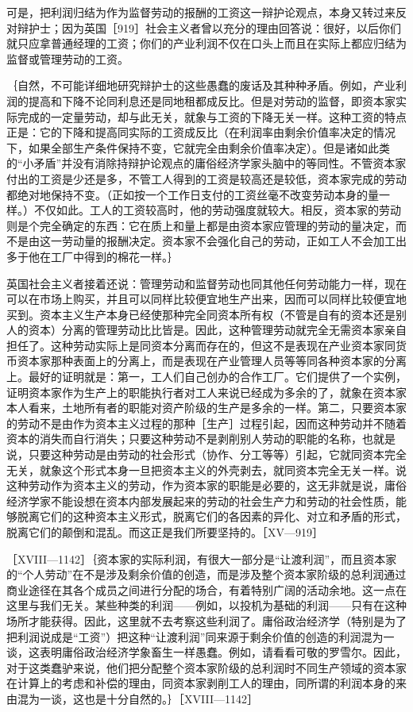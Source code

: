 可是，把利润归结为作为监督劳动的报酬的工资这一辩护论观点，本身又转过来反对辩护士；因为英国［919］社会主义者曾以充分的理由回答说：很好，以后你们就只应拿普通经理的工资；你们的产业利润不仅在口头上而且在实际上都应归结为监督或管理劳动的工资。

｛自然，不可能详细地研究辩护士的这些愚蠢的废话及其种种矛盾。例如，产业利润的提高和下降不论同利息还是同地租都成反比。但是对劳动的监督，即资本家实际完成的一定量劳动，却与此无关，就象与工资的下降无关一样。这种工资的特点正是：它的下降和提高同实际的工资成反比（在利润率由剩余价值率决定的情况下，如果全部生产条件保持不变，它就完全由剩余价值率决定）。但是诸如此类的“小矛盾”并没有消除持辩护论观点的庸俗经济学家头脑中的等同性。不管资本家付出的工资是少还是多，不管工人得到的工资是较高还是较低，资本家完成的劳动都绝对地保持不变。（正如按一个工作日支付的工资丝毫不改变劳动本身的量一样。）不仅如此。工人的工资较高时，他的劳动强度就较大。相反，资本家的劳动则是个完全确定的东西：它在质上和量上都是由资本家应管理的劳动的量决定，而不是由这一劳动量的报酬决定。资本家不会强化自己的劳动，正如工人不会加工出多于他在工厂中得到的棉花一样。｝

英国社会主义者接着还说：管理劳动和监督劳动也同其他任何劳动能力一样，现在可以在市场上购买，并且可以同样比较便宜地生产出来，因而可以同样比较便宜地买到。资本主义生产本身已经使那种完全同资本所有权（不管是自有的资本还是别人的资本）分离的管理劳动比比皆是。因此，这种管理劳动就完全无需资本家亲自担任了。这种劳动实际上是同资本分离而存在的，但这不是表现在产业资本家同货币资本家那种表面上的分离上，而是表现在产业管理人员等等同各种资本家的分离上。最好的证明就是：第一，工人们自己创办的合作工厂。它们提供了一个实例，证明资本家作为生产上的职能执行者对工人来说已经成为多余的了，就象在资本家本人看来，土地所有者的职能对资产阶级的生产是多余的一样。第二，只要资本家的劳动不是由作为资本主义过程的那种［生产］过程引起，因而这种劳动并不随着资本的消失而自行消失；只要这种劳动不是剥削别人劳动的职能的名称，也就是说，只要这种劳动是由劳动的社会形式（协作、分工等等）引起，它就同资本完全无关，就象这个形式本身一旦把资本主义的外壳剥去，就同资本完全无关一样。说这种劳动作为资本主义的劳动，作为资本家的职能是必要的，这无非就是说，庸俗经济学家不能设想在资本内部发展起来的劳动的社会生产力和劳动的社会性质，能够脱离它们的这种资本主义形式，脱离它们的各因素的异化、对立和矛盾的形式，脱离它们的颠倒和混乱。而这正是我们所要坚持的。［XV—919］


［XVIII—1142］｛资本家的实际利润，有很大一部分是“让渡利润”，而且资本家的“个人劳动”在不是涉及剩余价值的创造，而是涉及整个资本家阶级的总利润通过商业途径在其各个成员之间进行分配的场合，有着特别广阔的活动余地。这一点在这里与我们无关。某些种类的利润——例如，以投机为基础的利润——只有在这种场所才能获得。因此，这里就不去考察这些利润了。庸俗政治经济学（特别是为了把利润说成是“工资”）把这种“让渡利润”同来源于剩余价值的创造的利润混为一谈，这表明庸俗政治经济学象畜生一样愚蠢。例如，请看看可敬的罗雪尔。因此，对于这类蠢驴来说，他们把分配整个资本家阶级的总利润时不同生产领域的资本家在计算上的考虑和补偿的理由，同资本家剥削工人的理由，同所谓的利润本身的来由混为一谈，这也是十分自然的。｝［XVIII—1142］

